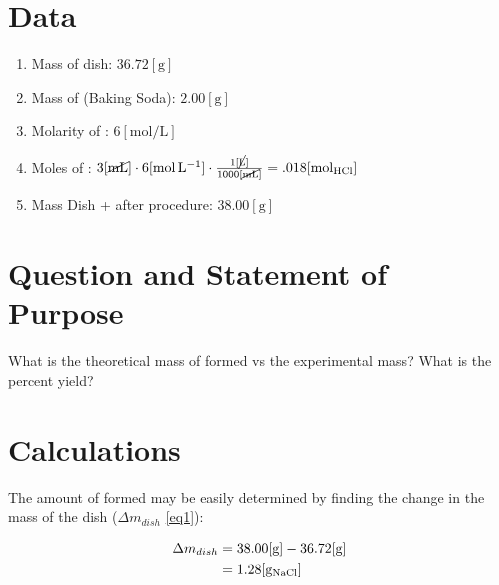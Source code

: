 \documentclass{article}
\begin{document}
\section{Data}

    \begin{enumerate}

      \item Mass of dish: $36.72[\si{\gram}]$

      \item Mass of  (Baking Soda): $2.00[\si{\gram}]$

      \item Molarity of : $6[\si{\mole\per\liter}]$

      \item Moles of : $3[\cancel{\si{\milli\liter}}]\cdot6[\si{\mole\per\liter}]\cdot\frac{1[\cancel{\si{\liter}}]}{1000[\cancel{\si{\milli\liter}}]}=.018[\si{\mole}_{\ce{HCl}}]$

      \item Mass Dish +  after procedure: $38.00[\si{\gram}]$

    \end{enumerate}

\section{Question and Statement of Purpose}

    \begin{justify}

      What is the theoretical mass of  formed vs the experimental mass? What is the percent yield?

    \end{justify}
    
\newpage

\section{Calculations}

    \begin{justify}

      The amount of  formed may be easily determined by finding the change in the mass of the dish ($\Delta m_{dish}$ \eqref{eq1}):
    \end{justify}

\begin{equation} \label{eq1}
\begin{split}
  \Delta m_{dish} & = 38.00[\si{\gram}]-36.72[\si{\gram}] \\
 & =1.28[\si{\gram}_{\ce{NaCl}}]
\end{split}
\end{equation}
\end{document}
